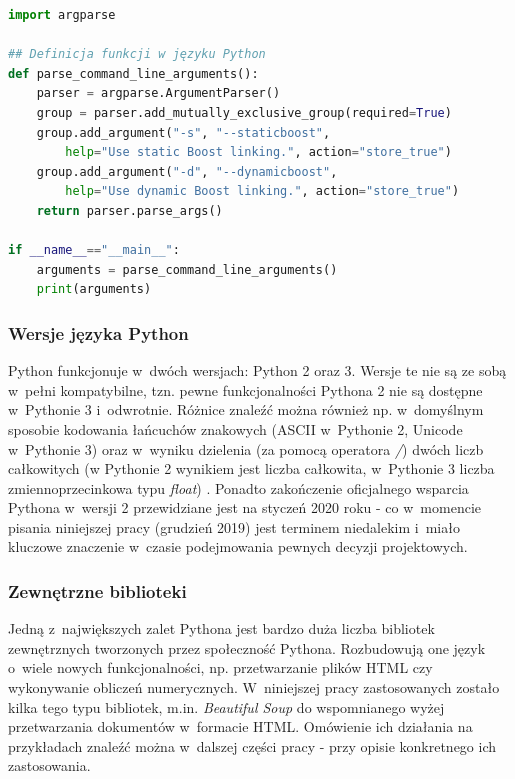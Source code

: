 \begin{lstlisting}[language=python,caption={Przykład prostego skryptu napisanego w~języku Python 3 - przetwarzanie argumentów podanych przez użytkownika do skryptu}, label={lst:pyexample}]
import argparse

## Definicja funkcji w języku Python
def parse_command_line_arguments():
    parser = argparse.ArgumentParser()
    group = parser.add_mutually_exclusive_group(required=True)
    group.add_argument("-s", "--staticboost", 
        help="Use static Boost linking.", action="store_true")
    group.add_argument("-d", "--dynamicboost",
        help="Use dynamic Boost linking.", action="store_true")
    return parser.parse_args()

if __name__=="__main__":
    arguments = parse_command_line_arguments()
    print(arguments)

\end{lstlisting}

\subsubsection*{Wersje języka Python}
Python funkcjonuje w~dwóch wersjach: Python 2 oraz 3. Wersje te nie są ze sobą w~pełni kompatybilne, tzn. pewne funkcjonalności Pythona 2 nie są dostępne w~Pythonie 3 i~odwrotnie. Różnice znaleźć można również np. w~domyślnym sposobie kodowania łańcuchów znakowych (ASCII w~Pythonie 2, Unicode w~Pythonie 3) oraz w~wyniku dzielenia (za pomocą operatora \textit{/}) dwóch liczb całkowitych (w Pythonie 2 wynikiem jest liczba całkowita, w~Pythonie 3 liczba zmiennoprzecinkowa typu \textit{float}) \cite{Python2vs3}. Ponadto zakończenie oficjalnego wsparcia Pythona w~wersji 2 przewidziane jest na styczeń 2020 roku \cite{Python2Countdown} - co w~momencie pisania niniejszej pracy (grudzień 2019) jest terminem niedalekim i~miało kluczowe znaczenie w~czasie podejmowania pewnych decyzji projektowych.

\subsubsection*{Zewnętrzne biblioteki}
Jedną z~największych zalet Pythona jest bardzo duża liczba bibliotek zewnętrznych tworzonych przez społeczność Pythona. Rozbudowują one język o~wiele nowych funkcjonalności, np. przetwarzanie plików HTML czy wykonywanie obliczeń numerycznych. W~niniejszej pracy zastosowanych zostało kilka tego typu bibliotek, m.in. \textit{Beautiful Soup} \cite{BeautifulSoup} do wspomnianego wyżej przetwarzania dokumentów w~formacie HTML. Omówienie ich działania na przykładach znaleźć można w~dalszej części pracy - przy opisie konkretnego ich zastosowania. 


